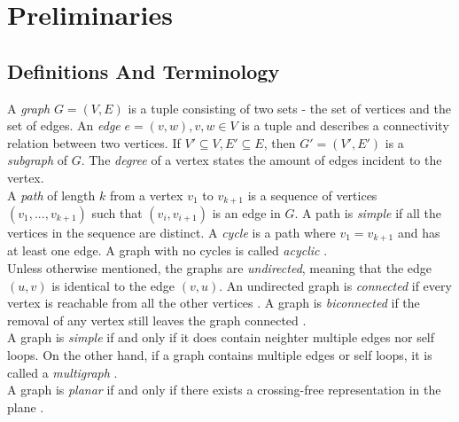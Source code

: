 \section{Preliminaries}
\subsection{Definitions And Terminology}
A \emph{graph} $G=(V,E)$ is a tuple consisting of two sets - the set of vertices and the set of edges. An \emph{edge} $e = (v,w), v,w \in V$ is a tuple and describes a connectivity relation between two vertices.
If $V'\subseteq V, E'\subseteq E$, then $G' = (V',E')$ is a \emph{subgraph} of $G$.
The \emph{degree} of a vertex states the amount of edges incident to the vertex.\\
A \emph{path} of length $k$ from a vertex $v_1$ to $v_{k+1}$ is a sequence of vertices $(v_1,...,v_{k+1})$ such that $(v_i,v_{i+1})$ is an edge in $G$.  A path is \emph{simple} if all the vertices in the sequence are distinct. A \emph{cycle} is a path where $v_1 = v_{k+1}$ and has at least one edge. A graph with no cycles is called \emph{acyclic} \cite[P. 1170]{DBLP:cormen_intro_to_algorithms}.\\
Unless otherwise mentioned, the graphs are \emph{undirected}, meaning that the edge $(u,v)$ is identical to the edge $(v,u)$.
An undirected graph is \emph{connected} if every vertex is reachable from all the other vertices \cite[P. 1170]{DBLP:cormen_intro_to_algorithms}.
A graph is \emph{biconnected} if the removal of any vertex still leaves the graph connected \cite[P. 224]{Duncan_planar_polyline_drawings}.\\
A graph is \emph{simple} if and only if it does contain neighter multiple edges nor self loops. On the other hand, if a graph contains multiple edges or self loops, it is called a \emph{multigraph} \cite[P. 1172]{DBLP:cormen_intro_to_algorithms}.\\
A graph is \emph{planar} if and only if there exists a crossing-free representation in the plane \cite[Page 100]{DBLP:cormen_intro_to_algorithms}.
